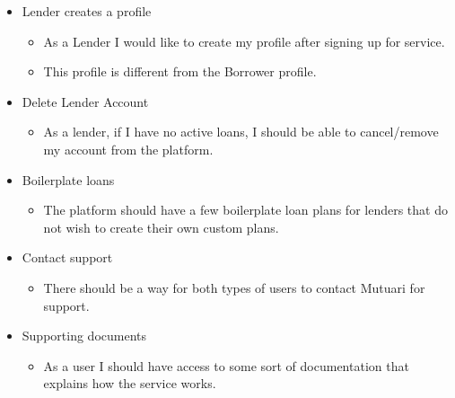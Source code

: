 \begin{itemize}
	\item Lender creates a profile
	\begin{itemize}
		\item As a Lender I would like to create my profile after signing up for service.
		\item This profile is different from the Borrower profile.
	\end{itemize}

	\item Delete Lender Account
	\begin{itemize}
		\item As a lender, if I have no active loans, I should be able to cancel/remove my account from the platform.
	\end{itemize}

	\item Boilerplate loans
	\begin{itemize}
		\item The platform should have a few boilerplate loan plans for lenders that do not wish to create their own custom plans.
	\end{itemize}

	\item Contact support
	\begin{itemize}
		\item There should be a way for both types of users to contact Mutuari for support.
	\end{itemize}

	\item Supporting documents
	\begin{itemize}
		\item As a user I should have access to some sort of documentation that explains how the service works.
	\end{itemize}

\end{itemize}
